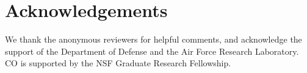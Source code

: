 %
%


\section*{Acknowledgements}
We thank the anonymous reviewers for helpful comments, and acknowledge the support of the Department of Defense and the Air Force Research Laboratory. CO is supported by the NSF Graduate Research Fellowship.